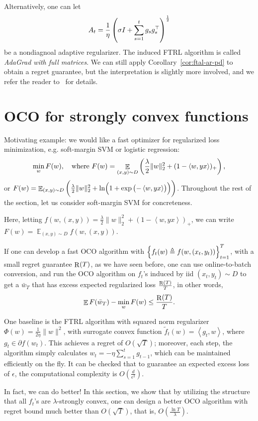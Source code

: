 \documentclass{article}
\DeclareMathOperator*{\R}{{\rm R}}
\DeclareMathOperator{\EE}{{\mathbb E}}
\newcommand{\defeq}{\triangleq}
\newcommand{\inner}[2]{\left\langle #1,#2 \right\rangle}
\begin{document}
Alternatively, one can let
\[ A_t = \frac1\eta \del{\sigma I + \sum_{s=1}^t g_s g_s^\top }^\frac12 \]
be a nondiagnoal adaptive regularizer. The induced FTRL algorithm is called {\em AdaGrad with full matrices}. We can still apply Corollary~\ref{cor:ftal-ar-pd} to obtain a regret guarantee, but the interpretation is slightly more involved, and we refer the reader to~\cite[][Section 5.6]{hazan2016introduction} for details.


\section{OCO for strongly convex functions}

Motivating example: we would like a fast optimizer for regularized loss minimization, e.g. soft-margin SVM or logistic regression:
\[ \min_{w} F(w), \quad \text{where } F(w) = \EE_{(x,y) \sim D} \del{\frac\lambda2\|w\|_2^2 + (1-\inner{w}{y x})_+}, \]
or $F(w) = \EE_{(x,y) \sim D} \del{\frac\lambda2\|w\|_2^2 + \ln(1 + \exp\del{-\inner{w}{y x}})}$. Throughout the rest of the section, let us consider soft-margin SVM for concreteness.

Here, letting $f(w, (x,y)) = \frac\lambda2\|w\|_2^2 + (1-\inner{w}{y x})_+$, we can write
$F(w) = \EE_{(x, y) \sim D} f(w, (x,y))$.

If one can develop a fast OCO algorithm with $\cbr{f_t(w) \defeq f(w, (x_t, y_t))}_{t=1}^T$, with a small regret guarantee $\R(T)$, as we have seen before, one can use online-to-batch conversion, and run the OCO algorithm on $f_t$'s induced by iid $(x_t, y_t) \sim D$ to get a $\bar{w}_{T}$ that has excess expected regularized loss $\frac{\R(T)}{T}$, in other words,
\[ \EE F(\bar{w}_T) - \min_{w} F(w) \leq \frac{\R(T)}{T}. \]

One baseline is the FTRL algorithm with squared norm regularizer $\Phi(w) = \frac{1}{2\eta}\|w\|^2$, with surrogate convex function $\tilde{f}_t(w) = \inner{g_t}{w}$, where $g_t \in \partial f(w_t)$. This achieves a regret of $O(\sqrt{T})$; moreover, each step, the algorithm simply calculates $w_t = - \eta \sum_{s=1}^t g_{t-1}$, which can be maintained efficiently on the fly. It can be checked that to guarantee an expected excess loss of $\epsilon$, the computational complexity is $O(\frac{d}{\epsilon^2})$.

In fact, we can do better! In this section, we show that by utilizing the structure that all $f_t$'s are $\lambda$-strongly convex, one can design a better OCO algorithm with regret bound much better than $O(\sqrt{T})$, that is, $O(\frac{\ln T}{\lambda})$.
\end{document}
